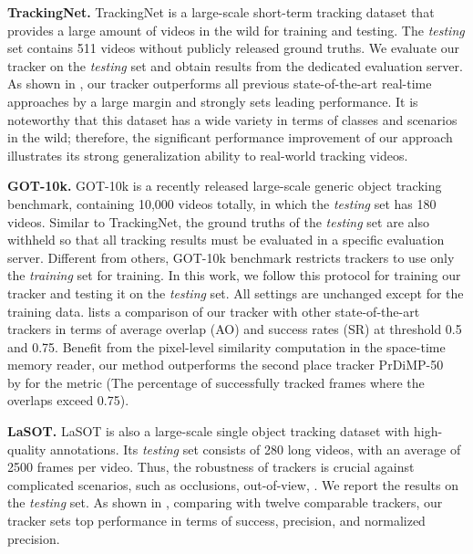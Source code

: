 \documentclass[final]{cvpr}
\begin{document}
\textbf{TrackingNet.}
TrackingNet \cite{muller2018trackingnet} is a large-scale short-term tracking dataset that provides a large amount of videos in the wild for training and testing.
The \textit{testing} set contains 511 videos without publicly released ground truths.
We evaluate our tracker on the \textit{testing} set and obtain results from the dedicated evaluation server.
As shown in , our tracker outperforms all previous state-of-the-art real-time approaches by a large margin and strongly sets leading performance.
It is noteworthy that this dataset has a wide variety in terms of classes and scenarios in the wild;
therefore, the significant performance improvement of our approach illustrates its strong generalization ability to real-world tracking videos.
\par
\textbf{GOT-10k.}
GOT-10k \cite{huang2019got} is a recently released large-scale generic object tracking benchmark, containing 10,000 videos totally, in which the \textit{testing} set has 180 videos.
Similar to TrackingNet, the ground truths of the \textit{testing} set are also withheld so that all tracking results must be evaluated in a specific evaluation server.
Different from others, GOT-10k benchmark restricts trackers to use only the \textit{training} set for training.
In this work, we follow this protocol for training our tracker and testing it on the \textit{testing} set.
All settings are unchanged except for the training data.
 lists a comparison of our tracker with other state-of-the-art trackers in terms of average overlap (AO) and success rates (SR) at threshold 0.5 and 0.75.
Benefit from the pixel-level similarity computation in the space-time memory reader, our method outperforms the second place tracker PrDiMP-50~\cite{danelljan2020probabilistic} by  for the  metric (The percentage of successfully tracked frames where the overlaps exceed 0.75).
\par
\textbf{LaSOT.}
LaSOT \cite{fan2019lasot} is also a large-scale single object tracking dataset with high-quality annotations.
Its \textit{testing} set consists of 280 long videos, with an average of 2500 frames per video.
Thus, the robustness of trackers is crucial against complicated scenarios, such as occlusions, out-of-view, \etc.
We report the results on the \textit{testing} set.
As shown in , comparing with twelve comparable trackers, our tracker sets top performance in terms of success, precision, and normalized precision.
\end{document}
